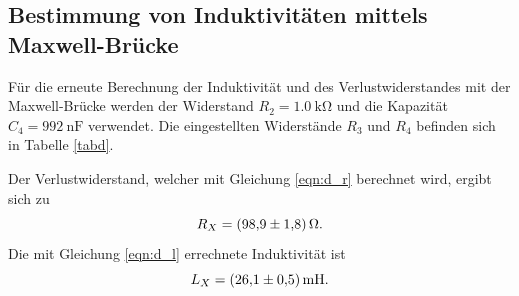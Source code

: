 \subsection{Bestimmung von Induktivitäten mittels Maxwell-Brücke}
Für die erneute Berechnung der Induktivität und des Verlustwiderstandes mit der Maxwell-Brücke werden der Widerstand
$R_2 = \SI{1.0}{\kilo\ohm}$ und die Kapazität $C_4 = \SI{992}{\nano\farad}$ verwendet.
Die eingestellten Widerstände $R_3$ und $R_4$ befinden sich in Tabelle \ref{tabd}.

\noindent Der Verlustwiderstand, welcher mit Gleichung \eqref{eqn:d_r} berechnet wird, ergibt sich zu
\begin{equation*}
    R_X = \SI{98.9 \pm 1.8}{\ohm}.
\end{equation*}
Die mit Gleichung \eqref{eqn:d_l} errechnete Induktivität ist
\begin{equation*}
    L_X = \SI{26.1 \pm 0.5}{\milli\henry}.
\end{equation*}

